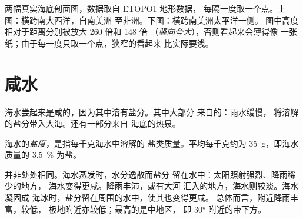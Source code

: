 \begin{omfigure}
{\small 两幅真实海底剖面图，数据取自 ETOPO1 地形数据，
每隔一度取一个点。上图：横跨南大西洋，自南美洲
至非洲。下图：横跨南美洲太平洋一侧。
图中高度相对于距离分别被放大 260 倍和 148 倍
（\emph{竖向夸大}），否则看起来会薄得像
一张纸；由于每一度只取一个点，狭窄的看起来
比实际要浅。}
\label{fig:g8:the-oceans:profiles}
\end{omfigure}


\section{咸水}

海水尝起来是咸的，因为其中溶有盐分。其中大部分
来自的：雨水缓慢，
将溶解的盐分带入大海。还有一部分来自
海底的热泉。

\begin{definition}[盐度]\label{def:g8:the-oceans:salinity}
海水的\emph{盐度}，是指每千克海水中溶解的
盐类质量。平均每千克约为
\qty{35}{g}，即海水质量的 \qty{3.5}{\%}
为盐。
\end{definition}

并非处处相同。海水蒸发时，水分逸散而盐分
留在水中：太阳照射强烈、降雨稀少的地方，
海水变得更咸。降雨丰沛，或有大河
汇入的地方，海水则较淡。海水凝固成
海冰时，盐分留在周围的水中，使其也变得更咸。
总体而言，附近降雨丰富，较低，
极地附近亦较低；最高的是中地区，
即 \ang{30} 附近的带下方。

